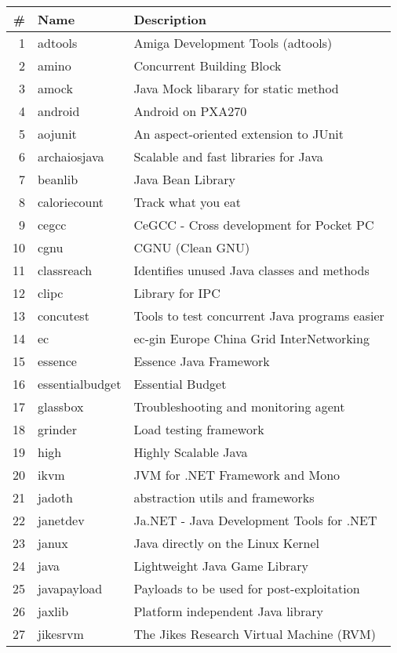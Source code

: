 
\begin{table}[ht]
\centering
\begin{tabular}{|r|l|l|} \hline
 \# & Name & Description \\ \hline
  1 & adtools & Amiga Development Tools (adtools) \\
  2 & amino & Concurrent Building Block \\ 
  3 & amock & Java Mock libarary for static method \\ 
  4 & android & Android on PXA270 \\ 
  5 & aojunit & An aspect-oriented extension to JUnit \\ 
  6 & archaiosjava & Scalable and fast libraries for Java \\ 
  7 & beanlib & Java Bean Library \\ 
  8 & caloriecount & Track what you eat \\ 
  9 & cegcc & CeGCC - Cross development for Pocket PC \\ 
  10 & cgnu & CGNU (Clean GNU) \\ 
  11 & classreach & Identifies unused Java classes and methods \\ 
  12 & clipc & Library for IPC \\ 
  13 & concutest & Tools to test concurrent Java programs easier \\ 
  14 & ec & ec-gin Europe China Grid InterNetworking  \\ 
  15 & essence & Essence Java Framework  \\ 
  16 & essentialbudget & Essential Budget \\ 
  17 & glassbox & Troubleshooting and monitoring agent \\ 
  18 & grinder & Load testing framework \\ 
  19 & high & Highly Scalable Java  \\ 
  20 & ikvm & JVM for .NET Framework and Mono \\ 
  21 & jadoth & abstraction utils and frameworks \\ 
  22 & janetdev & Ja.NET - Java Development Tools for .NET \\ 
  23 & janux & Java directly on the Linux Kernel \\ 
  24 & java & Lightweight Java Game Library \\ 
  25 & javapayload & Payloads to be used for post-exploitation \\ 
  26 & jaxlib & Platform independent Java library \\ 
  27 & jikesrvm & The Jikes Research Virtual Machine (RVM) \\ 

\end{tabular}
\end{table}

